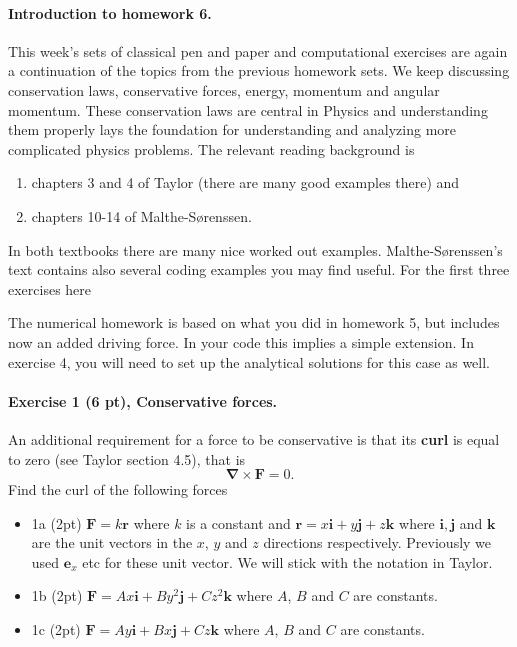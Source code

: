 \documentclass[%
oneside,                 %
final,                   %
10pt]{article}
\begin{document}
\noindent
\paragraph{Introduction to homework 6.}
This week's sets of classical pen and paper and computational
exercises are again a continuation of the topics from the previous homework sets. We keep
discussing conservation laws, conservative forces, energy, momentum and angular momentum. These conservation laws are central in Physics and understanding them properly lays the foundation for understanding and analyzing more complicated physics problems.
The relevant reading background is
\begin{enumerate}
\item chapters 3 and 4 of Taylor (there are many good examples there) and

\item chapters 10-14 of Malthe-Sørenssen.
\end{enumerate}

\noindent
In both textbooks there are many nice worked out examples. Malthe-Sørenssen's text contains also several coding examples you may find useful. For the first three exercises here 


The numerical homework is based on what you did in homework 5, but includes now an added driving force. In your code this implies a simple extension. In exercise 4, you will need to set up the analytical solutions for this case as well. 


\paragraph{Exercise 1 (6 pt), Conservative forces.}
An additional requirement for a force to be conservative is that its \textbf{curl} is equal to zero (see Taylor section 4.5), that is
\[
\bm{\nabla}\times \bm{F} =0.
\]
Find the curl of the following forces
\begin{itemize}
\item 1a (2pt) $\bm{F}=k\bm{r}$ where $k$ is a constant and $\bm{r}=x\bm{i}+y\bm{j}+z\bm{k}$ where $\bm{i},\bm{j}$ and $\bm{k}$ are the unit vectors in the $x$, $y$ and $z$ directions respectively. Previously we used $\bm{e}_x$ etc for these unit vector. We will stick with the notation in Taylor.

\item 1b (2pt) $\bm{F}=Ax\bm{i}+By^2\bm{j}+Cz^2\bm{k}$ where $A$, $B$ and $C$ are constants.

\item 1c (2pt) $\bm{F}=Ay\bm{i}+Bx\bm{j}+Cz\bm{k}$ where $A$, $B$ and $C$ are constants.
\end{itemize}
\end{document}

